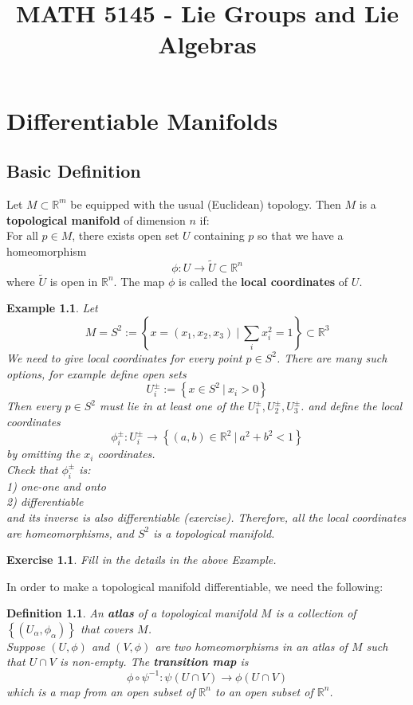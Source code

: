 \documentclass[11pt]{book}
\title{MATH 5145 - Lie Groups and Lie Algebras}
\date{}
\newtheorem{example}[theorem]{Example}
\newtheorem{exercise}[theorem]{Exercise}
\newtheorem{definition}[theorem]{Definition}
\newcommand{\bb}[1]{\mathbb{#1}}
\begin{document}
\maketitle
\tableofcontents

\newpage
\chapter{Differentiable Manifolds}
\section{Basic Definition}
Let $M \subset \bb{R}^m$ be equipped with the usual (Euclidean) topology. Then $M$ is a \textbf{topological manifold} of dimension $n$ if:\\

For all $p \in M$, there exists open set $U$ containing $p$ so that we have a homeomorphism
$$\phi: U \to \tilde{U} \subset \bb{R}^n$$
where $\tilde{U}$ is open in $\bb{R}^n$. The map $\phi$ is called the \textbf{local coordinates} of $U$.
\begin{example}
Let
$$M  = S^2 := \left\{ x = (x_1, x_2, x_3)\ \Big|\ \sum_i x_i^2 = 1 \right\} \subset \bb{R}^3$$
We need to give local coordinates for every point $p \in S^2$. There are many such options, for example define open sets
$$U_i^{\pm} := \left\{ x \in S^2\ \Big|\ x_i > 0 \right\}$$
Then every $p \in S^2$ must lie in at least one of the $U_1^{\pm}, U_2^{\pm}, U_3^{\pm}$.
and define the local coordinates
$$\phi_i^{\pm} : U_i^{\pm} \to \left\{(a,b) \in \bb{R}^2\ \Big|\ a^2 + b^2 < 1 \right\}$$
by omitting the $x_i$ coordinates.\\
Check that $\phi_i^{\pm}$ is:\\
1) one-one and onto\\
2) differentiable\\
and its inverse is also differentiable (exercise). Therefore, all the local coordinates are homeomorphisms, and $S^2$ is a topological manifold.
\end{example}
\begin{exercise}
Fill in the details in the above Example.
\end{exercise}
In order to make a topological manifold differentiable, we need the following:
\begin{definition}
An \textbf{atlas} of a topological manifold $M$ is a collection of $\left\{(U_{\alpha}, \phi_{\alpha})\right\}$ that covers $M$.\\
Suppose $(U,\phi)$ and $(V,\phi)$ are two homeomorphisms in an atlas of $M$ such that $U \cap V$ is non-empty. The \textbf{transition map} is
$$ \phi \circ \psi^{-1} : \psi(U \cap V) \to \phi(U \cap V)$$
which is a map from an open subset of $\bb{R}^n$ to an open subset of $\bb{R}^n$.
\end{definition}
\end{document}
